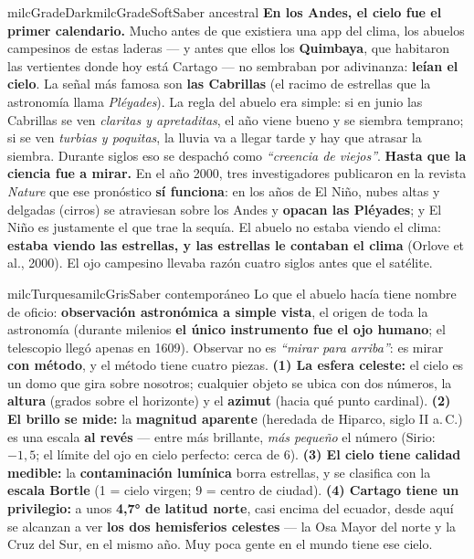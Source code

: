 \documentclass[11pt,letterpaper]{article}
\begin{document}
\begin{softbox}{milcGradeDark}{milcGradeSoft}{Saber ancestral}
\textbf{En los Andes, el cielo fue el primer calendario.} Mucho antes de que existiera una app del clima, los abuelos campesinos de estas laderas --- y antes que ellos los \textbf{Quimbaya}, que habitaron las vertientes donde hoy está Cartago --- no sembraban por adivinanza: \textbf{leían el cielo}. La señal más famosa son \textbf{las Cabrillas} (el racimo de estrellas que la astronomía llama \emph{Pléyades}). La regla del abuelo era simple: si en junio las Cabrillas se ven \emph{claritas y apretaditas}, el año viene bueno y se siembra temprano; si se ven \emph{turbias y poquitas}, la lluvia va a llegar tarde y hay que atrasar la siembra. Durante siglos eso se despachó como \emph{``creencia de viejos''}. \textbf{Hasta que la ciencia fue a mirar.} En el año 2000, tres investigadores publicaron en la revista \emph{Nature} que ese pronóstico \textbf{sí funciona}: en los años de El Niño, nubes altas y delgadas (cirros) se atraviesan sobre los Andes y \textbf{opacan las Pléyades}; y El Niño es justamente el que trae la sequía. El abuelo no estaba viendo el clima: \textbf{estaba viendo las estrellas, y las estrellas le contaban el clima} (Orlove et al., 2000). El ojo campesino llevaba razón cuatro siglos antes que el satélite.
\end{softbox}

\begin{softbox}{milcTurquesa}{milcGris}{Saber contemporáneo}
Lo que el abuelo hacía tiene nombre de oficio: \textbf{observación astronómica a simple vista}, el origen de toda la astronomía (durante milenios \textbf{el único instrumento fue el ojo humano}; el telescopio llegó apenas en 1609). Observar no es \emph{``mirar para arriba''}: es mirar \textbf{con método}, y el método tiene cuatro piezas. \textbf{(1) La esfera celeste:} el cielo es un domo que gira sobre nosotros; cualquier objeto se ubica con dos números, la \textbf{altura} (grados sobre el horizonte) y el \textbf{azimut} (hacia qué punto cardinal). \textbf{(2) El brillo se mide:} la \textbf{magnitud aparente} (heredada de Hiparco, siglo II a.\,C.) es una escala \textbf{al revés} --- entre más brillante, \emph{más pequeño} el número (Sirio: $-1{,}5$; el límite del ojo en cielo perfecto: cerca de $6$). \textbf{(3) El cielo tiene calidad medible:} la \textbf{contaminación lumínica} borra estrellas, y se clasifica con la \textbf{escala Bortle} (1 = cielo virgen; 9 = centro de ciudad). \textbf{(4) Cartago tiene un privilegio:} a unos \textbf{4,7° de latitud norte}, casi encima del ecuador, desde aquí se alcanzan a ver \textbf{los dos hemisferios celestes} --- la Osa Mayor del norte y la Cruz del Sur, en el mismo año. Muy poca gente en el mundo tiene ese cielo.
\end{softbox}
\end{document}
